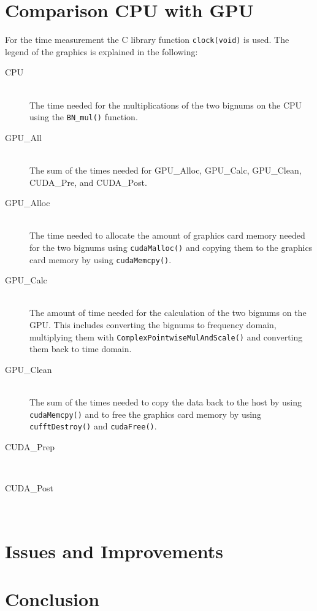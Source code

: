 \documentclass[12pt,a4paper]{article}
\begin{document}
\section{Comparison CPU with GPU}
For the time measurement the C library function \texttt{clock(void)} is used. The legend of the graphics is explained in the following:
\begin{description}
\item[CPU]\hfill \\
The time needed for the multiplications of the two bignums on the CPU using the \texttt{BN_mul()} function.
\item[GPU\_All]\hfill \\ 
The sum of the times needed for GPU\_Alloc, GPU\_Calc, GPU\_Clean, CUDA\_Pre, and CUDA\_Post.
\item[GPU\_Alloc]\hfill \\ 
The time needed to allocate the amount of graphics card memory needed for the two bignums using \texttt{cudaMalloc()} and copying them to the graphics card memory by using \texttt{cudaMemcpy()}.
\item[GPU\_Calc]\hfill \\ 
The amount of time needed for the calculation of the two bignums on the GPU. This includes converting the bignums to frequency domain, multiplying them with \texttt{ComplexPointwiseMulAndScale()} and converting them back to time domain.
\item[GPU\_Clean]\hfill \\ 
The sum of the times needed to copy the data back to the host by using \texttt{cudaMemcpy()} and to free the graphics card memory by using \texttt{cufftDestroy()} and \texttt{cudaFree()}.
\item[CUDA\_Prep]\hfill \\ 
\item[CUDA\_Post]\hfill \\ 
\end{description}




\section{Issues and Improvements}

\section{Conclusion}


\end{document}
